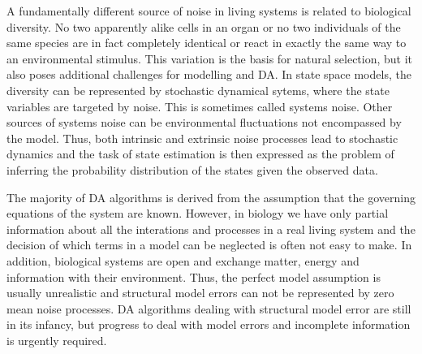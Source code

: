 \documentclass[10pt,a4paper, twocolumn]{article}
\begin{document}
A fundamentally different source of noise in living systems is related to biological diversity. No two  apparently alike cells in an organ or no two individuals of the same species  are in fact completely identical or react in exactly the same way to  an environmental stimulus. This variation is the basis for natural selection, but it also poses additional challenges for modelling and DA. In state space models, the diversity can be represented by stochastic dynamical sytems, where the state variables are targeted by noise. This is sometimes called systems noise. Other sources of systems noise can be environmental fluctuations not encompassed by the model. Thus, both intrinsic and extrinsic noise processes lead to stochastic dynamics and the task of state estimation is then expressed as the problem of inferring the probability distribution of the states given the observed data.


The majority of DA algorithms is derived from the assumption 
that the governing equations of the system are known.  However, in biology  we have only partial information about all the interations and processes in a real living system and the decision of which terms in a model can be neglected is often not easy to make. In addition, biological systems are open and exchange matter, energy and information with their environment. Thus, the perfect model assumption is usually unrealistic and structural model errors can not be represented by zero mean noise processes. DA algorithms dealing with structural model error are still in its infancy, but progress to deal with model errors and incomplete information is urgently required. 
\end{document}
